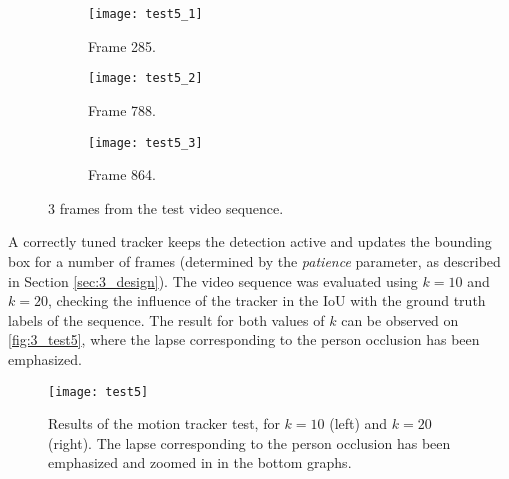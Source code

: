 \begin{figure}[h]
	\centering
	\begin{subfigure}[b]{0.3\linewidth}
		\centering
		\texttt{[image: test5\_1]}
		\caption{Frame 285.}
	\end{subfigure}
	\begin{subfigure}[b]{0.3\linewidth}
		\centering
		\texttt{[image: test5\_2]}
		\caption{Frame 788.}
	\end{subfigure}
	\begin{subfigure}[b]{0.3\linewidth}
		\centering
		\texttt{[image: test5\_3]}
		\caption{Frame 864.}
	\end{subfigure}
	\caption{3 frames from the test video sequence.}
	\label{fig:3_test5_frames}
\end{figure}



A correctly tuned tracker keeps the detection active and updates the bounding box for a number of frames (determined by the \textit{patience} parameter, as described in Section \ref{sec:3_design}). The video sequence was evaluated using $k=10$ and $k=20$, checking the influence of the tracker in the IoU with the ground truth labels of the sequence. The result for both values of $k$ can be observed on \autoref{fig:3_test5}, where the lapse corresponding to the person occlusion has been emphasized.

\begin{figure}[h]
	\centering
	\texttt{[image: test5]}
	\caption{Results of the motion tracker test, for $k=10$ (left) and $k=20$ (right). The lapse corresponding to the person occlusion has been emphasized and zoomed in in the bottom graphs.}
	\label{fig:3_test5}
\end{figure}


